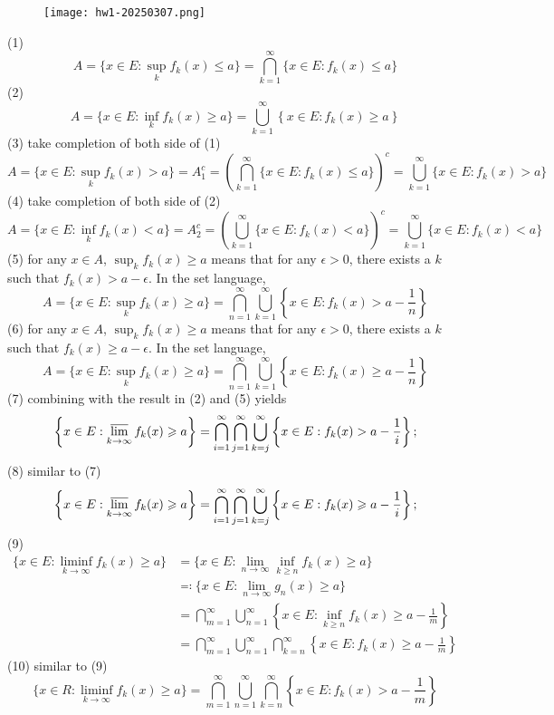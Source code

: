 \begin{figure}[H]
\centering
\texttt{[image: hw1-20250307.png]}
\label{}
\end{figure}

(1)
\[
A=\{ x\in E :\sup_{k}f_k(x)\leq a\} =\bigcap_{k=1}^{\infty}\{ x\in E:f_k(x)\leq a \}
\]
(2)
\[
A=\{ x\in E:\inf _kf_k(x)\geq a \}=\bigcup_{k=1}^{\infty}\left\{  x\in E :f_k(x)\geq a \right\}
\]
(3) take completion of both side of (1)
\[
A=\{ x\in E :\sup _kf_k(x)>a\}=A_1^{c}=\left( \bigcap_{k=1}^{\infty}  \{ x\in E:f_k(x)\leq a \}\right)^{c}=\bigcup_{k=1}^{\infty} \{ x\in E:f_k(x)>a \}
\]
(4) take completion of both side of (2)
\[
A=\{ x\in E:\inf _kf_k(x)<a\}=A_2^{c}=\left( \bigcup_{k=1}^{\infty} \{ x\in E :f_k(x)<a\} \right)^{c}=\bigcup_{k=1}^{\infty} \{ x\in E:f_k(x)<a \}
\]
(5) for any $x\in A$, $\sup _kf_k(x)\geq a$ means that for any $\epsilon>0$, there exists a $k$ such that $f_k(x)>a-\epsilon$. In the set language,
\[
A=\{ x\in E:\sup _kf_k(x)\geq a \}=\bigcap_{n=1}^{\infty}\bigcup_{k=1}^{\infty} \left\{  x\in E:f_k(x)>a-\frac{1}{n}  \right\}
\]
(6) for any $x\in A$, $\sup _kf_k(x)\geq a$ means that for any $\epsilon>0$, there exists a $k$ such that $f_k(x)\geq a-\epsilon$. In the set language,
\[
A=\{ x\in E:\sup _kf_k(x)\geq a \}=\bigcap_{n=1}^{\infty}\bigcup_{k=1}^{\infty} \left\{  x\in E:f_k(x)\geq  a-\frac{1}{n}  \right\}
\]
(7) combining with the result in (2) and (5) yields
\[
\left\{x \in E: \varlimsup_{k \rightarrow \infty} f_k(x) \geqslant a\right\}=\bigcap_{i=1}^{\infty} \bigcap_{j=1}^{\infty} \bigcup_{k=j}^{\infty}\left\{x \in E: f_k(x)>a-\frac{1}{i}\right\} ;
\]
(8) similar to (7)
\[
\left\{x \in E: \varlimsup_{k \rightarrow \infty} f_k(x) \geqslant a\right\}=\bigcap_{i=1}^{\infty} \bigcap_{j=1}^{\infty} \bigcup_{k=j}^{\infty}\left\{x \in E: f_k(x) \geqslant a-\frac{1}{i}\right\} ;
\]
(9)
\[
\begin{aligned}
\{ x\in E:\liminf_{ k \to \infty } f_k(x)\geq a \} & =\{ x\in E:\lim_{ n \to \infty } \inf_{k\geq n}f_k(x)\geq a \} \\
 & \eqqcolon \{ x\in E:\lim_{ n \to \infty } g_n(x)\geq a \} \\
 & =\bigcap_{m=1}^{\infty} \bigcup_{n=1}^{\infty}\left\{  x\in E:\inf_{k\geq n}f_k(x)\geq a-\frac{1}{m}  \right\} \\
 & =\bigcap_{m=1}^{\infty} \bigcup_{n=1}^{\infty} \bigcap_{k=n}^{\infty }\left\{  x\in E:f_k(x)\geq a-\frac{1}{m}  \right\}  
\end{aligned}
\]
(10) similar to (9)
\[
\{ x\in R:\liminf_{ k \to \infty } f_k(x)\geq a \}=\bigcap_{m=1}^{\infty}\bigcup_{n=1}^{\infty} \bigcap_{k=n}^{\infty} \left\{  x\in E:f_k(x)>a-\frac{1}{m}  \right\}
\]

